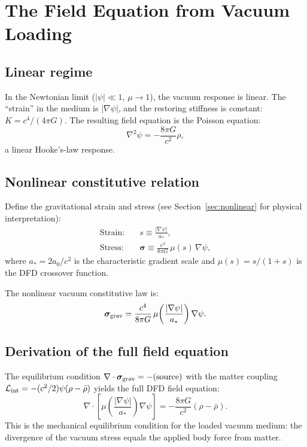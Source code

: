 \documentclass[aps,prd,twocolumn,superscriptaddress,nofootinbib]{revtex4-2}
\begin{document}
\section{The Field Equation from Vacuum Loading}
\label{sec:field-eqn}

\subsection{Linear regime}

In the Newtonian limit ($|\psi| \ll 1$, $\mu \to 1$), the vacuum
response is linear.  The ``strain'' in the medium is $|\nabla\psi|$,
and the restoring stiffness is constant: $K = c^4/(4\pi G)$.  The
resulting field equation is the Poisson equation:
\begin{equation}
\nabla^2\psi = -\frac{8\pi G}{c^2}\rho,
\end{equation}
a linear Hooke's-law response.

\subsection{Nonlinear constitutive relation}

Define the gravitational strain and stress (see
Section~\ref{sec:nonlinear} for physical interpretation):
\begin{align}
\text{Strain:} \quad & s \equiv \frac{|\nabla\psi|}{a_*},
\label{eq:strain-def} \\
\text{Stress:} \quad & \bm{\sigma} \equiv
\frac{c^4}{8\pi G}\,\mu(s)\,\nabla\psi,
\label{eq:stress-def}
\end{align}
where $a_* = 2a_0/c^2$ is the characteristic gradient scale and
$\mu(s) = s/(1+s)$ is the DFD crossover function.

The nonlinear vacuum constitutive law is:
\begin{equation}
\bm{\sigma}_{\rm grav}
= \frac{c^4}{8\pi G}\,\mu\!\left(\frac{|\nabla\psi|}{a_*}\right)
\nabla\psi.
\label{eq:constitutive-nonlinear}
\end{equation}

\subsection{Derivation of the full field equation}

The equilibrium condition
$\nabla \cdot \bm{\sigma}_{\rm grav} = -(\text{source})$
with the matter coupling
$\mathcal{L}_{\rm int} = -(c^2/2)\psi(\rho - \bar\rho)$
yields the full DFD field equation:
\begin{equation}
\nabla\cdot\!\left[\mu\!\left(\frac{|\nabla\psi|}{a_*}\right)
\nabla\psi\right]
= -\frac{8\pi G}{c^2}(\rho - \bar\rho).
\label{eq:full-field}
\end{equation}
This is the mechanical equilibrium condition for the loaded vacuum
medium: the divergence of the vacuum stress equals the applied body
force from matter.
\end{document}
